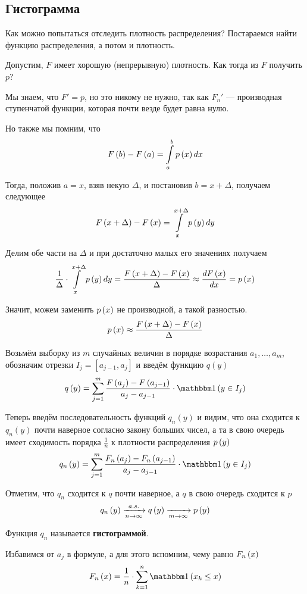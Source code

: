 \subsection{Гистограмма}
Как можно попытаться отследить плотность распределения?
Постараемся найти функцию распределения, а потом и плотность.

Допустим, $F$ имеет хорошую (непрерывную) плотность.
Как тогда из $F$ получить $p$?

Мы знаем, что $F'=p$, но это никому не нужно, так как $F_n'$ --- производная
ступенчатой функции, которая почти везде будет равна нулю.

Но также мы помним, что
$$F\left(b\right)-F\left(a\right)=\int\limits_a^b p\left(x\right) dx$$

Тогда, положив $a=x$, взяв некую $\Delta$, и постановив $b=x+\Delta$,
получаем следующее
$$F\left(x+\Delta\right)-F\left(x\right)=\int\limits_x^{x+\Delta} p\left(y\right) dy$$

Делим обе части на $\Delta$ и при достаточно малых его значениях получаем
$$\frac{1}{\Delta}\cdot\int\limits_x^{x+\Delta} p\left(y\right) dy
=\frac{F\left(x+\Delta\right)-F\left(x\right)}{\Delta}
\approx\frac{dF\left(x\right)}{dx}=p\left(x\right)$$

Значит, можем заменить $p\left(x\right)$ не производной, а такой разностью.
$$p\left(x\right)\approx\frac{F\left(x+\Delta\right)-F\left(x\right)}{\Delta}$$

Возьмём выборку из $m$ случайных величин в порядке возрастания
$a_1, \dots, a_m$, обозначим отрезки $I_j=[a_{j-1},a_j]$
и введём функцию $q\left(y\right)$
$$q\left(y\right)
=\sum_{j=1}^m \frac{\cdf{a_j}-\cdf{a_{j-1}}}{a_j-a_{j-1}}
    \cdot\indicator{y\in I_j}$$

Теперь введём последовательность функций $q_n\left(y\right)$ и видим,
что она сходится к $q_n\left(y\right)$ почти наверное
согласно закону больших чисел,
а та в свою очередь имеет сходимость порядка $\frac{1}{n}$
к плотности распределения $p\left(y\right)$
\begin{equation}\label{eq:histogram_start}
q_n\left(y\right)
=\sum_{j=1}^m \frac{\cdfn{a_j}-\cdfn{a_{j-1}}}{a_j-a_{j-1}}
    \cdot\indicator{y\in I_j}
\end{equation}

Отметим, что $q_n$ сходится к $q$ почти наверное, а $q$ в свою очередь
сходится к $p$
$$q_n\left(y\right)\xrightarrow[n\to\infty]{a.s.} q\left(y\right)\xrightarrow[m\to\infty]{}p\left(y\right)$$

Функция $q_n$ называется \textbf{гистограммой}.

Избавимся от $a_j$ в формуле, а для этого вспомним, чему равно $F_n\left(x\right)$
$$\cdfn{x}=\frac{1}{n}\cdot \sum_{k=1}^n
\indicator{x_k\le x}$$

